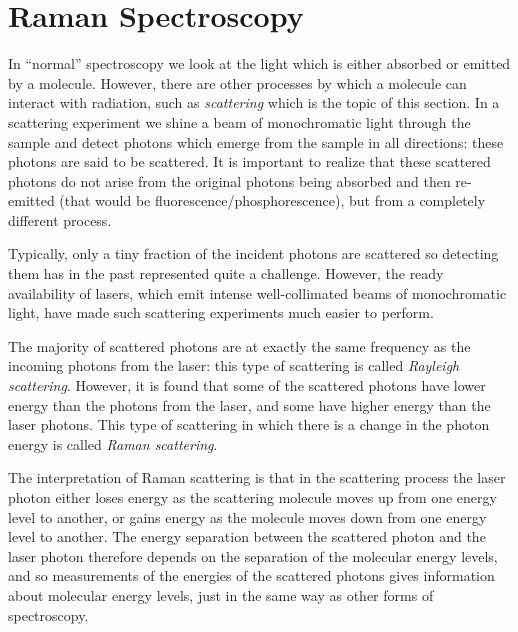 \documentclass{article}
\theoremstyle{plain}\theoremheaderfont{\normalfont\itshape}\theorembodyfont{\rmfamily}\theoremseparator{.}\newtheorem*{rem}{Remark}\newtheorem*{ex}{Example}\newtheorem*{proof}{Proof}\newtheorem*{altp}{Alternative proof}
\theoremstyle{plain}\theoremheaderfont{\normalfont\bfseries}\theorembodyfont{\rmfamily}\theoremseparator{.}\newtheorem{thm}{Theorem}[section]\newtheorem{lem}[thm]{Lemma}\newtheorem{prop}[thm]{Proposition}\newtheorem*{cor}{Corollary}\newtheorem{defn}[thm]{Definition}\newtheorem{clm}[thm]{Claim}\newtheorem{clminproof}{Claim}\newtheorem{pos}{Postulate}[section]
\theoremstyle{break}\theoremheaderfont{\normalfont\itshape}\theorembodyfont{\rmfamily}\theoremseparator{.\medskip}\newtheorem*{proofskip}{Proof}\newtheorem*{exs}{Examples}\newtheorem*{rems}{Remarks}
\theoremstyle{break}\theoremheaderfont{\normalfont\bfseries}\theorembodyfont{\rmfamily}\theoremseparator{.\medskip}\newtheorem{lemskip}[thm]{Lemma}\newtheorem{defnskip}[thm]{Definition}\newtheorem{propskip}[thm]{Proposition}\newtheorem{thmskip}[thm]{Theorem}
\numberwithin{equation}{section}
\begin{document}
    \newpage

    \section{Raman Spectroscopy}
    In ``normal'' spectroscopy we look at the light which is either absorbed or emitted by a molecule. However, there are other processes by which a molecule can interact with radiation, such as \textit{scattering} which is the topic of this section. In a scattering experiment we shine a beam of monochromatic light through the sample and detect photons which emerge from the sample in all directions: these photons are said to be scattered. It is important to realize that these scattered photons do not arise from the original photons being absorbed and then re-emitted (that would be fluorescence/phosphorescence), but from a completely different process.

    Typically, only a tiny fraction of the incident photons are scattered so detecting them has in the past represented quite a challenge. However, the ready availability of lasers, which emit intense well-collimated beams of monochromatic light, have made such scattering experiments much easier to perform.

    The majority of scattered photons are at exactly the same frequency as the incoming photons from the laser: this type of scattering is called \textit{Rayleigh scattering}. However, it is found that some of the scattered photons have lower energy than the photons from the laser, and some have higher energy than the laser photons. This type of scattering in which there is a change in the photon energy is called \textit{Raman scattering}.
    
    The interpretation of Raman scattering is that in the scattering process the laser photon either loses energy as the scattering molecule moves up from one energy level to another, or gains energy as the molecule moves down from one energy level to another. The energy separation between the scattered photon and the laser photon therefore depends on the separation of the molecular energy levels, and so measurements of the energies of the scattered photons gives information about molecular energy levels, just in the same way as other forms of spectroscopy.
\end{document}
